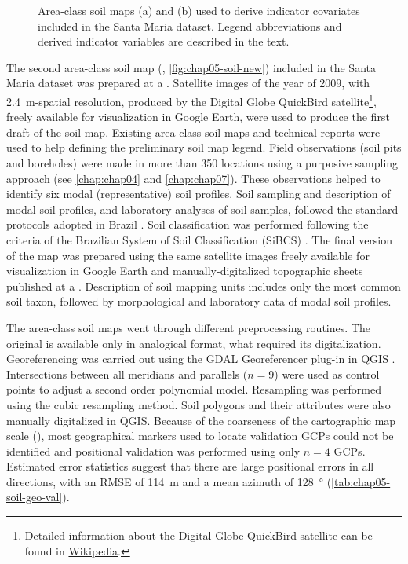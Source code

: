 \begin{figure}[!ht]
\begin{minipage}[b]{0.45\textwidth}
\end{minipage} 
\caption[Area-class soil maps included in the Santa Maria dataset.]{Area-class soil maps (a) \soilOld{} and 
(b) \soilNew{} used to derive indicator covariates included in the Santa Maria dataset. Legend abbreviations 
and derived indicator variables are described in the text.}
\label{fig:chap05-soil-maps}
\end{figure}

\def\footquick{\footnote{Detailed information about the Digital Globe\rr{} QuickBird satellite can be found 
in \href{https://en.wikipedia.org/wiki/QuickBird}{Wikipedia}.}}

The second area-class soil map (\soilNew, \autoref{fig:chap05-soil-new}) included in the Santa Maria dataset 
\cite{Miguel2010} was prepared at a . Satellite images of the year of 2009, with 
\SI{2.4}{\m}-spatial resolution, produced by the Digital Globe\rr{} QuickBird satellite\footquick{}, freely 
available for visualization in Google Earth\rr{}, were used to produce the first draft of the soil map. 
Existing area-class soil maps and technical reports \cite{Pedron2005, Poelking2007, Sturmer2008} were used to 
help defining the preliminary soil map legend. Field observations (soil pits and boreholes) were made in 
more than \num{350} locations using a purposive sampling approach (see \autoref{chap:chap04} and 
\autoref{chap:chap07}). These observations helped to identify six modal (representative) soil profiles. Soil 
sampling and description of modal soil profiles, and laboratory analyses of soil samples, followed the 
standard protocols adopted in Brazil \cite{ClaessenEtAl1997, SantosEtAl2005}. Soil classification was 
performed following the criteria of the Brazilian System of Soil Classification (SiBCS) \cite{SantosEtAl2006}. 
The final version of the map was prepared using the same satellite images freely available for visualization 
in Google Earth\rr{} and manually-digitalized topographic sheets published at a  \cite{DSG1992a, 
DSG1992}. Description of soil mapping units includes only the most common soil taxon, followed by 
morphological and laboratory data of modal soil profiles.

The area-class soil maps went through different preprocessing routines. The original \soilOld{} is available 
only in analogical format, what required its digitalization. Georeferencing was carried out using the GDAL 
Georeferencer plug-in in QGIS \cite{GDAL2013, QGIS2013}. Intersections between all meridians and parallels 
($n = 9$) were used as control points to adjust a second order polynomial model. Resampling was performed 
using the cubic resampling method. Soil polygons and their attributes were also manually digitalized in QGIS. 
Because of the coarseness of the cartographic map scale (), most geographical markers used to 
locate validation GCPs could not be identified and positional validation was performed using only $n = 4$ 
GCPs. Estimated error statistics suggest that there are large positional errors in all directions, with an 
RMSE of \SI{114}{\m} and a mean azimuth of \SI{128}{\degree} (\autoref{tab:chap05-soil-geo-val}).

